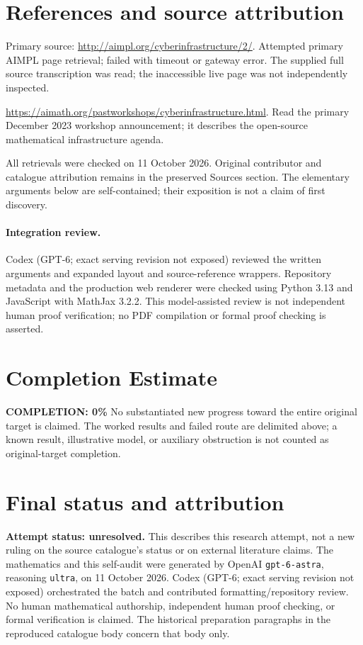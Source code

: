 \documentclass[11pt]{article}
\begin{document}
\section{References and source attribution}
Primary source: \url{http://aimpl.org/cyberinfrastructure/2/}. Attempted primary AIMPL page retrieval; failed with timeout or gateway error. The supplied full source transcription was read; the inaccessible live page was not independently inspected.

\url{https://aimath.org/pastworkshops/cyberinfrastructure.html}. Read the primary December 2023 workshop announcement; it describes the open-source mathematical infrastructure agenda.

All retrievals were checked on 11 October 2026. Original contributor and catalogue attribution remains in the preserved Sources section. The elementary arguments below are self-contained; their exposition is not a claim of first discovery.


\paragraph{Integration review.} Codex (GPT-6; exact serving revision not exposed) reviewed the written arguments and expanded layout and source-reference wrappers. Repository metadata and the production web renderer were checked using Python 3.13 and JavaScript with MathJax 3.2.2. This model-assisted review is not independent human proof verification; no PDF compilation or formal proof checking is asserted.

\section{Completion Estimate}
\noindent\textbf{COMPLETION: 0\%}
No substantiated new progress toward the entire original target is claimed. The worked results and failed route are delimited above; a known result, illustrative model, or auxiliary obstruction is not counted as original-target completion.

\section{Final status and attribution}
\textbf{Attempt status: unresolved.} This describes this research attempt, not a new ruling on the source catalogue's status or on external literature claims.
The mathematics and this self-audit were generated by OpenAI \texttt{gpt-6-astra}, reasoning \texttt{ultra}, on 11 October 2026. Codex (GPT-6; exact serving revision not exposed) orchestrated the batch and contributed formatting/repository review. No human mathematical authorship, independent human proof checking, or formal verification is claimed. The historical preparation paragraphs in the reproduced catalogue body concern that body only.
\end{document}
